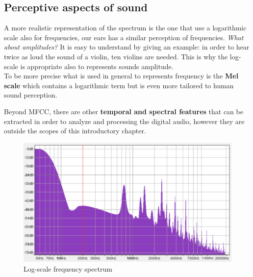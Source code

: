 \subsection{Perceptive aspects of sound}
A more realistic representation of the spectrum is the one that use a logarithmic scale also for frequencies, our ears has a similar perception of frequencies. \textit{What about amplitudes?} It is easy to understand by giving an example: in order to hear twice as loud the sound of a violin, ten violins are needed. This is why the log-scale is appropriate also to represents sounds amplitude.\\
To be more precise what is used in general to represents frequency is the \textbf{Mel scale} which contains a logarithmic term but is even more tailored to human sound perception.

Beyond MFCC, there are other \textbf{temporal and spectral features} that can be extracted in order to analyze and processing the digital audio, however they are outside the scopes of this introductory chapter.

\begin{figure}
    \centering
    \includegraphics[scale=0.6]{img/logScaleSpectrum.png}
    \caption{Log-scale frequency spectrum}
\end{figure}

\newpage
